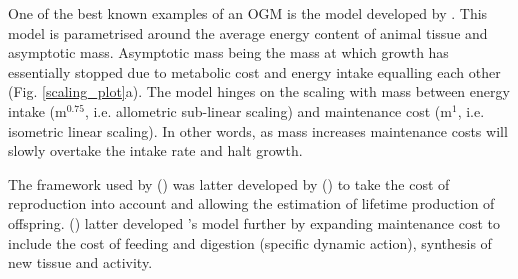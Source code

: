 \documentclass[a4paper, 11pt, hidelinks]{article} %
\begin{document}
	
%	

	One of the best known examples of an OGM is the model developed by \cite{West2001}.  This model is parametrised around the average energy content of animal tissue and asymptotic mass.  Asymptotic mass being the mass at which growth has essentially stopped due to metabolic cost and energy intake equalling each other (Fig. \ref{scaling_plot}a). The model hinges on the scaling with mass between energy intake (m$^{0.75}$, i.e. allometric sub-linear scaling) and maintenance cost (m$^1$, i.e. isometric linear scaling).  In other words, as mass increases maintenance costs will slowly overtake the intake rate and halt growth.  	
	
	The framework used by \citeauthor{West2001} (\citeyear{West2001}) was latter developed by \citeauthor{Charnov2001} (\citeyear{Charnov2001}) to take the cost of reproduction into account and allowing the estimation of lifetime production of offspring.  \citeauthor{Hou2008} (\citeyear{Hou2008}) latter developed \citeauthor{West2001}'s model further by expanding maintenance cost to include the cost of feeding and digestion (specific dynamic action), synthesis of new tissue and activity.
	
\end{document}
